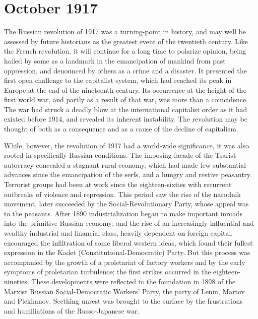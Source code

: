 \chapter{October 1917}

The Russian revolution of 1917 was a turning-point in history, and may well be assessed by future historians as the greatest event of the twentieth century. Like the French revolution, it will continue for a long time to polarize opinion, being hailed by some as a landmark in the emancipation of mankind from past oppression, and denounced by others as a crime and a disaster. It presented the first open challenge to the capitalist system, which had reached its peak in Europe at the end of the nineteenth century. Its occurrence at the height of the first world war, and partly as a result of that war, was more than a coincidence. The war had struck a deadly blow at the international capitalist order as it had existed before 1914, and revealed its inherent instability. The revolution may be thought of both as a consequence and as a cause of the decline of capitalism. 

While, however, the revolution of 1917 had a world-wide significance, it was also rooted in specifically Russian conditions. The imposing facade of the Tsarist autocracy concealed a stagnant rural economy, which had made few substantial advances since the emancipation of the serfs, and a hungry and restive peasantry. Terrorist groups had been at work since the eighteen-sixties with recurrent outbreaks of violence and repression. This period saw the rise of the narodnik movement, later succeeded by the Social-Revolutionary Party, whose appeal was to the peasants. After 1890 industrialization began to make important inroads into the primitive Russian economy; and the rise of an increasingly influential and wealthy industrial and financial class, heavily dependent on foreign capital, encouraged the infiltration of some liberal western ideas, which found their fullest expression in the Kadet (Constitutional-Democratic) Party. But this process was accompanied by the growth of a proletariat of factory workers and by the early symptoms of proletarian turbulence; the first strikes occurred in the eighteen-nineties. 
These developments were reflected in the foundation in 1898 of the Marxist Russian Social-Democratic Workers' Party, the party of Lenin, Martov and Plekhanov. Seething unrest was brought to the surface by the frustrations and humiliations of the Russo-Japanese war. 


